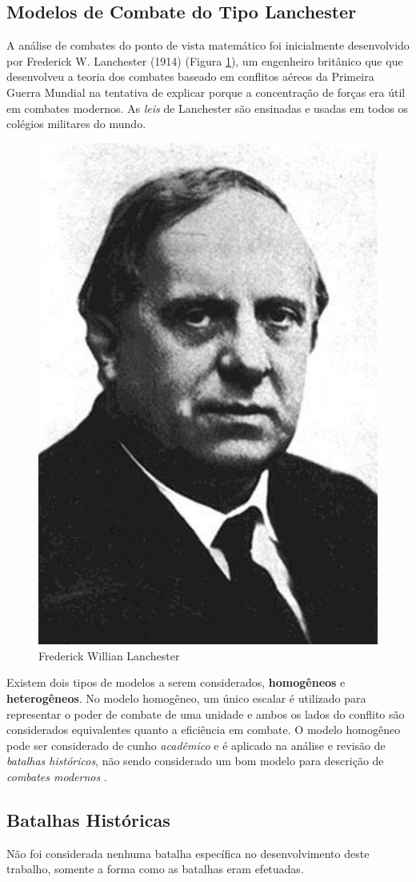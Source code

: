 \documentclass{article}
\begin{document}
\subsection{Modelos de Combate do Tipo Lanchester}

A análise de combates do ponto de vista matemático foi inicialmente desenvolvido por Frederick W. Lanchester (1914) (Figura \ref{fig:fw-lanchester}), um engenheiro britânico que que desenvolveu a teoria dos combates baseado em conflitos aéreos da Primeira Guerra Mundial na tentativa de explicar porque a concentração de forças era útil em combates modernos. As \textit{leis} de Lanchester são ensinadas e usadas em todos os colégios militares do mundo.

\begin{figure}[ht]
	\centering
	\includegraphics[width=0.3\linewidth]{figs/fw_lanchester_693x1024.jpg}
	\caption{Frederick Willian Lanchester}
	\label{fig:fw-lanchester}
\end{figure}

Existem dois tipos de modelos a serem considerados, \textbf{homogêneos} e \textbf{heterogêneos}. No modelo homogêneo, um único escalar é utilizado para representar o poder de combate de uma unidade e ambos os lados do conflito são considerados equivalentes quanto a eficiência em combate. O modelo homogêneo pode ser considerado de cunho \textit{acadêmico} e é aplicado na análise e revisão de \textit{batalhas históricos}, não sendo considerado um bom modelo para descrição de \textit{combates modernos} \cite{giordana03first}.

\subsection{Batalhas Históricas}

Não foi considerada nenhuma batalha específica no desenvolvimento deste trabalho, somente a forma como as batalhas eram efetuadas.
\end{document}
